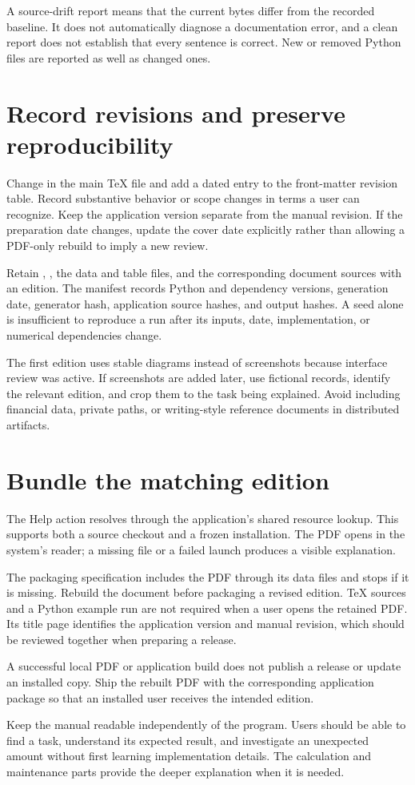 A source-drift report means that the current bytes differ from the recorded baseline. It does not automatically diagnose a documentation error, and a clean report does not establish that every sentence is correct. New or removed Python files are reported as well as changed ones.

\section{Record revisions and preserve reproducibility}
Change  in the main TeX file and add a dated entry to the front-matter revision table. Record substantive behavior or scope changes in terms a user can recognize. Keep the application version separate from the manual revision. If the preparation date changes, update the cover date explicitly rather than allowing a PDF-only rebuild to imply a new review.

Retain , , the data and table files, and the corresponding document sources with an edition. The manifest records Python and dependency versions, generation date, generator hash, application source hashes, and output hashes. A seed alone is insufficient to reproduce a run after its inputs, date, implementation, or numerical dependencies change.

The first edition uses stable diagrams instead of screenshots because interface review was active. If screenshots are added later, use fictional records, identify the relevant edition, and crop them to the task being explained. Avoid including financial data, private paths, or writing-style reference documents in distributed artifacts.

\section{Bundle the matching edition}
The Help action resolves  through the application's shared resource lookup. This supports both a source checkout and a frozen installation. The PDF opens in the system's reader; a missing file or a failed launch produces a visible explanation.

The packaging specification includes the PDF through its  data files and stops if it is missing. Rebuild the document before packaging a revised edition. TeX sources and a Python example run are not required when a user opens the retained PDF. Its title page identifies the application version and manual revision, which should be reviewed together when preparing a release.

A successful local PDF or application build does not publish a release or update an installed copy. Ship the rebuilt PDF with the corresponding application package so that an installed user receives the intended edition.

Keep the manual readable independently of the program. Users should be able to find a task, understand its expected result, and investigate an unexpected amount without first learning implementation details. The calculation and maintenance parts provide the deeper explanation when it is needed.
